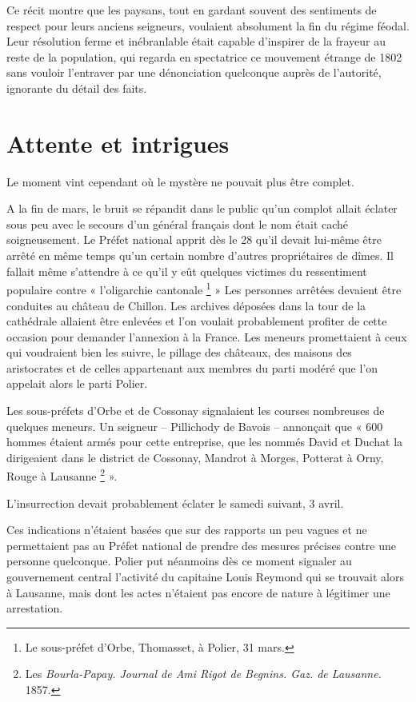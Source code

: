 \documentclass[french,twoside]{book} %
\begin{document}
\noindent Ce récit montre que les paysans, tout en gardant souvent des sentiments de respect pour leurs anciens seigneurs, voulaient absolument la fin du régime féodal. Leur résolution ferme et inébranlable était capable d’inspirer de la frayeur au reste de la population, qui regarda en spectatrice ce mouvement étrange de 1802 sans vouloir l’entraver par une dénonciation quelconque auprès de l’autorité, ignorante du détail des faits.
\section[Attente et intrigues]{Attente et intrigues}
\noindent Le moment vint cependant où le mystère ne pouvait plus être complet.\par
A la fin de mars, le bruit se répandit dans le public qu’un complot allait éclater sous peu avec le secours d’un général français dont le nom était caché soigneusement. Le Préfet national apprit dès le 28 qu’il devait lui-même être arrêté en même temps qu’un certain nombre d’autres propriétaires de dîmes. Il fallait même s’attendre à ce qu’il y eût quelques victimes du ressentiment populaire contre « l’oligarchie cantonale \footnote{Le sous-préfet d’Orbe, Thomasset, à Polier, 31 mars.} » Les personnes arrêtées devaient être conduites au château de Chillon. Les archives déposées dans la tour de la cathédrale allaient être enlevées et l’on voulait probablement profiter de cette occasion pour demander l’annexion à la France. Les meneurs promettaient à ceux qui voudraient bien les suivre, le pillage des châteaux, des maisons des aristocrates et de celles appartenant aux membres du parti modéré que l’on appelait alors le parti Polier.\par
Les sous-préfets d’Orbe et de Cossonay signalaient les courses nombreuses de quelques meneurs. Un seigneur – Pillichody de Bavois – annonçait que « 600 hommes étaient armés pour cette entreprise, que les nommés David et Duchat la dirigeaient dans le district de Cossonay, Mandrot à Morges, Potterat à Orny, Rouge à Lausanne \footnote{Les \emph{Bourla-Papay. Journal de Ami Rigot de Begnins. Gaz. de Lausanne.} 1857.} ».\par
L’insurrection devait probablement éclater le samedi suivant, 3 avril.\par
Ces indications n’étaient basées que sur des rapports un peu vagues et ne permettaient pas au Préfet national de prendre des mesures précises contre une personne quelconque. Polier put néanmoins dès ce moment signaler au gouvernement central l’activité du capitaine Louis Reymond qui se trouvait alors à Lausanne, mais dont les actes n’étaient pas encore de nature à légitimer une arrestation.\par
\end{document}
